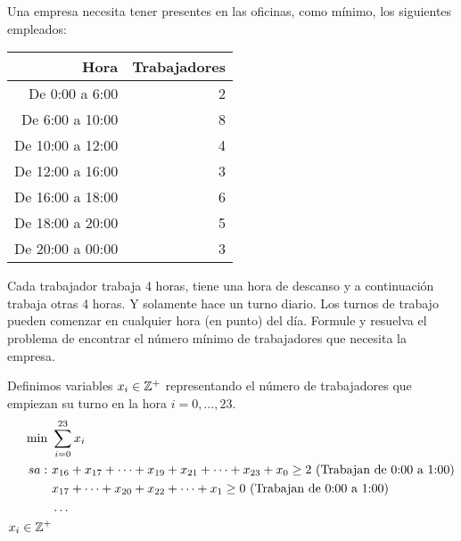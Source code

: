 \documentclass[twoside]{article}
\begin{document}
\begin{ejercicio}{11}
Una empresa necesita tener presentes en las oficinas, como mínimo, los siguientes empleados:
\begin{center}
\begin{tabular}{r r}
\hline
Hora & Trabajadores\\
\hline
\hline
De 0:00 a 6:00 & 2\\
De 6:00 a 10:00 & 8\\
De 10:00 a 12:00 & 4\\
De 12:00 a 16:00 & 3\\
De 16:00 a 18:00 & 6\\
De 18:00 a 20:00 & 5\\
De 20:00 a 00:00 & 3\\
\hline
\end{tabular}
\end{center}
Cada trabajador trabaja 4 horas, tiene una hora de descanso y a continuación trabaja otras 4 horas. Y solamente hace un turno diario. Los turnos de trabajo pueden comenzar en cualquier hora (en punto) del día. Formule y resuelva el problema de encontrar el número mínimo de trabajadores que necesita la empresa.
\end{ejercicio}
\begin{solucion}
Definimos variables $x_i\in\mathbb{Z}^+$ representando el número de trabajadores que empiezan su turno en la hora $i=0,\dots, 23$.
\begin{align*}
\min\ &\sum_{i=0}^{23} x_i\\
sa:\ & x_{16}+x_{17}+\dots +x_{19}+x_{21}+\dots +x_{23}+x_0\geq 2\ (\text{Trabajan de 0:00 a 1:00})\\
 & x_{17}+\dots +x_{20}+x_{22} +\dots +x_{1}\geq 0\ (\text{Trabajan de 0:00 a 1:00})\\
 & \dots \\
 x_i\in\Z^+
\end{align*}
\end{solucion}

\newpage

\newpage
\end{document}
